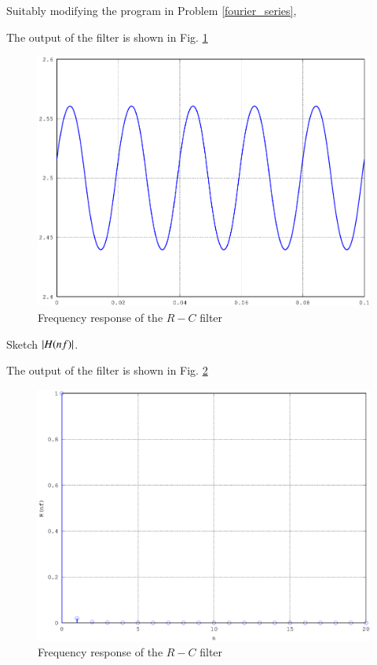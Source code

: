 %
Suitably modifying the program in Problem \ref{fourier_series},
%

%
The output of the filter is shown  in Fig. \ref{fig:2.5}
\begin{figure}[!h]
\centering
\includegraphics[width=\columnwidth]{./chapter2/figs/2.5.eps}
\caption{Frequency response of the $R-C$ filter}
\label{fig:2.5}
\end{figure}
\begin{problem}
Sketch $\left\vert H(nf)\right\vert$.
\end{problem}
%
\solution

%
The output of the filter is shown  in Fig. \ref{fig:2.6}
\begin{figure}[!h]
\centering
\includegraphics[width=\columnwidth]{./chapter2/figs/2.6.eps}
\caption{Frequency response of the $R-C$ filter}
\label{fig:2.6}
\end{figure}

